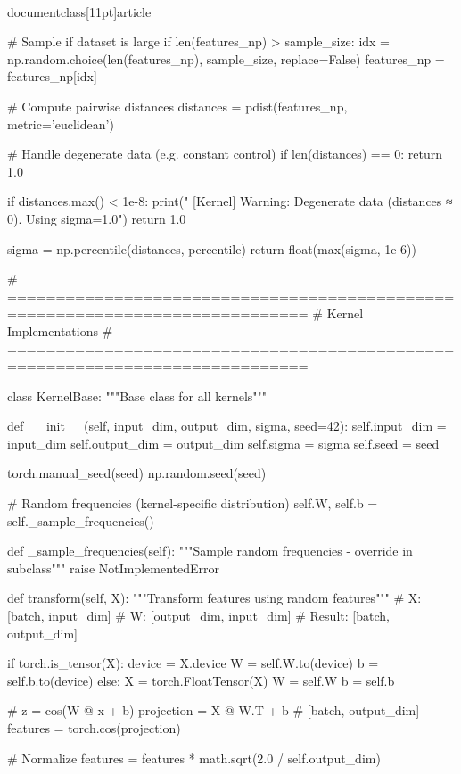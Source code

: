 \\documentclass[11pt]{article}
\begin{document}
\begin{CodeBlock}
    # Sample if dataset is large
    if len(features_np) > sample_size:
        idx = np.random.choice(len(features_np), sample_size, replace=False)
        features_np = features_np[idx]
        
    # Compute pairwise distances
    distances = pdist(features_np, metric='euclidean')
    
    # Handle degenerate data (e.g. constant control)
    if len(distances) == 0:
        return 1.0
        
    if distances.max() < 1e-8:
        print("  [Kernel] Warning: Degenerate data (distances ≈ 0). Using sigma=1.0")
        return 1.0
        
    sigma = np.percentile(distances, percentile)
    return float(max(sigma, 1e-6))


# =============================================================================
# Kernel Implementations
# =============================================================================

class KernelBase:
    """Base class for all kernels"""
    
    def __init__(self, input_dim, output_dim, sigma, seed=42):
        self.input_dim = input_dim
        self.output_dim = output_dim
        self.sigma = sigma
        self.seed = seed
        
        torch.manual_seed(seed)
        np.random.seed(seed)
        
        # Random frequencies (kernel-specific distribution)
        self.W, self.b = self._sample_frequencies()
    
    def _sample_frequencies(self):
        """Sample random frequencies - override in subclass"""
        raise NotImplementedError
    
    def transform(self, X):
        """Transform features using random features"""
        # X: [batch, input_dim]
        # W: [output_dim, input_dim]
        # Result: [batch, output_dim]
        
        if torch.is_tensor(X):
            device = X.device
            W = self.W.to(device)
            b = self.b.to(device)
        else:
            X = torch.FloatTensor(X)
            W = self.W
            b = self.b
        
        # z = cos(W @ x + b)
        projection = X @ W.T + b  # [batch, output_dim]
        features = torch.cos(projection)
        
        # Normalize
        features = features * math.sqrt(2.0 / self.output_dim)
        

\end{CodeBlock}
\end{document}
